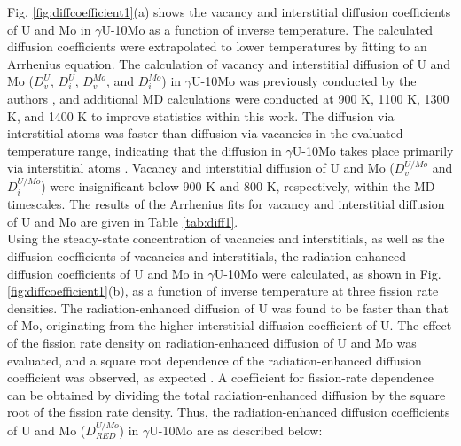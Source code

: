 \documentclass[preprint,12pt]{elsarticle}
\begin{document}
\indent Fig. \ref{fig:diffcoefficient1}(a) shows the vacancy and interstitial diffusion coefficients of U and Mo in $\gamma$U-10Mo as a function of inverse temperature. The calculated diffusion coefficients were extrapolated to lower temperatures by fitting to an Arrhenius equation. The calculation of vacancy and interstitial diffusion of U and Mo ($D^{U}_{v}$, $D^{U}_{i}$, $D^{Mo}_{v}$, and $D^{Mo}_{i}$) in $\gamma$U-10Mo was previously conducted by the authors \cite{park2021atomistic}, and additional MD calculations were conducted at 900 K, 1100 K, 1300 K, and 1400 K to improve statistics within this work. The diffusion via interstitial atoms was faster than diffusion via vacancies in the evaluated temperature range, indicating that the diffusion in $\gamma$U-10Mo takes place primarily via interstitial atoms \cite{park2021atomistic, smirnova2015atomistic}. Vacancy and interstitial diffusion of U and Mo ($D^{U/Mo}_{v}$ and $D^{U/Mo}_{i}$) were insignificant below 900 K and 800 K, respectively, within the MD timescales. The results of the Arrhenius fits for vacancy and interstitial diffusion of U and Mo are given in Table \ref{tab:diff1}.\\
\indent Using the steady-state concentration of vacancies and interstitials, as well as the diffusion coefficients of vacancies and interstitials, the radiation-enhanced diffusion coefficients of U and Mo in $\gamma$U-10Mo were calculated, as shown in Fig. \ref{fig:diffcoefficient1}(b), as a function of inverse temperature at three fission rate densities. The radiation-enhanced diffusion of U was found to be faster than that of Mo, originating from the higher interstitial diffusion coefficient of U. The effect of the fission rate density on radiation-enhanced diffusion of U and Mo was evaluated, and a square root dependence of the radiation-enhanced diffusion coefficient was observed, as expected \cite{cooper2021irradiation, matthews2020cluster}. A coefficient for fission-rate dependence can be obtained by dividing the total radiation-enhanced diffusion by the square root of the fission rate density. Thus, the radiation-enhanced diffusion coefficients of U and Mo ($D_{RED}^{U/Mo}$) in $\gamma$U-10Mo are as described below:\\
\end{document}
